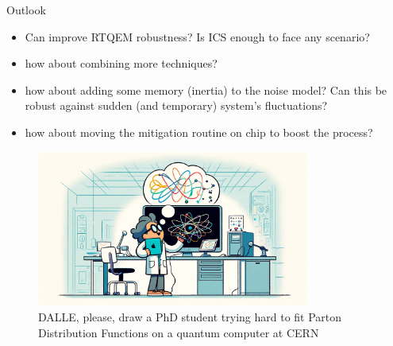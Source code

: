 \documentclass[8pt, xcolor={svgnames}, hyperref={linkcolor=black}]{beamer}
\begin{document}
\begin{frame}{Outlook}
\begin{itemize}[noitemsep]
\item[\faSend] Can improve RTQEM robustness? Is ICS enough to face any scenario?
\item[\faSend] how about combining more techniques?
\item[\faSend] how about adding some memory (inertia) to the noise model? Can this be 
robust against sudden (and temporary) system's fluctuations?
\item[\faSend] how about moving the mitigation routine on chip to boost the process?
\end{itemize}
\begin{figure}
    \includegraphics[width=0.8\textwidth]{figures/me.png}%
    \caption*{DALLE, please, draw a PhD student trying hard to fit Parton Distribution Functions on a quantum computer at CERN}
\end{figure}
\end{frame}
\end{document}

